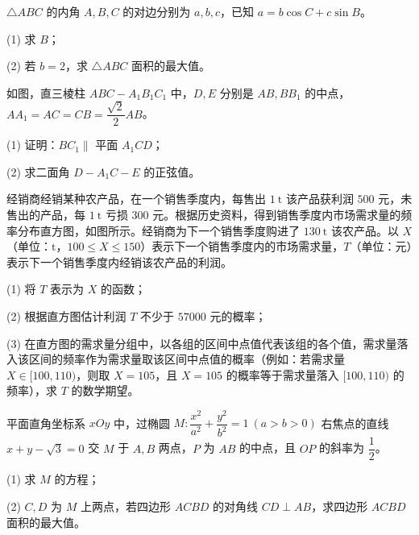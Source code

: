 \begin{question}
$\triangle ABC$ 的内角 $A,B,C$ 的对边分别为 $a,b,c$，已知 $a=b\cos C+c\sin B$。

(1) 求 $B$；

(2) 若 $b=2$，求 $\triangle ABC$ 面积的最大值。

\Needspace{0.4\textheight}
\end{question}
\begin{question}
如图，直三棱柱 $ABC-A_1B_1C_1$ 中，$D,E$ 分别是 $AB,BB_1$ 的中点，$AA_1=AC=CB=\dfrac{\sqrt2}{2}AB$。
\nopagebreak[4]
\begin{center}\end{center}
\nopagebreak[4]
(1) 证明：$BC_1\parallel$ 平面 $A_1CD$；

(2) 求二面角 $D-A_1C-E$ 的正弦值。

\Needspace{0.4\textheight}
\end{question}
\begin{question}
经销商经销某种农产品，在一个销售季度内，每售出 $1\ \mathrm t$ 该产品获利润 $500$ 元，未售出的产品，每 $1\ \mathrm t$ 亏损 $300$ 元。根据历史资料，得到销售季度内市场需求量的频率分布直方图，如图所示。经销商为下一个销售季度购进了 $130\ \mathrm t$ 该农产品。以 $X$（单位：$\mathrm t$，$100\leqslant X\leqslant150$）表示下一个销售季度内的市场需求量，$T$（单位：元）表示下一个销售季度内经销该农产品的利润。
\nopagebreak[4]
\begin{center}\end{center}
\nopagebreak[4]
(1) 将 $T$ 表示为 $X$ 的函数；

(2) 根据直方图估计利润 $T$ 不少于 $57000$ 元的概率；

(3) 在直方图的需求量分组中，以各组的区间中点值代表该组的各个值，需求量落入该区间的频率作为需求量取该区间中点值的概率（例如：若需求量 $X\in[100,110)$，则取 $X=105$，且 $X=105$ 的概率等于需求量落入 $[100,110)$ 的频率），求 $T$ 的数学期望。

\end{question}
\begin{question}
平面直角坐标系 $xOy$ 中，过椭圆 $M:\dfrac{x^2}{a^2}+\dfrac{y^2}{b^2}=1\ (a>b>0)$ 右焦点的直线 $x+y-\sqrt3=0$ 交 $M$ 于 $A,B$ 两点，$P$ 为 $AB$ 的中点，且 $OP$ 的斜率为 $\dfrac12$。

(1) 求 $M$ 的方程；

(2) $C,D$ 为 $M$ 上两点，若四边形 $ACBD$ 的对角线 $CD\perp AB$，求四边形 $ACBD$ 面积的最大值。

\end{question}

